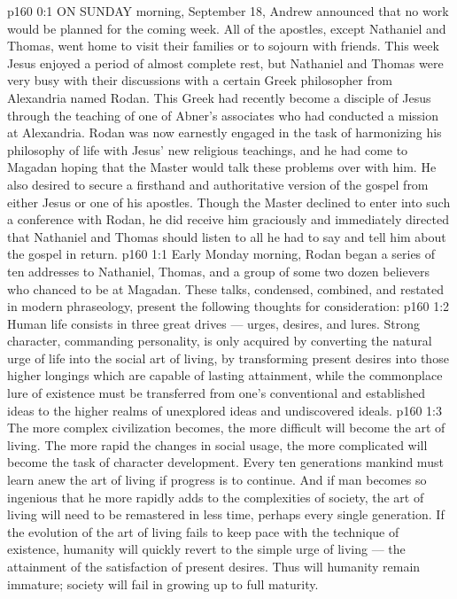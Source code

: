 \vs p160 0:1 ON SUNDAY morning, September 18, Andrew announced that no work would be planned for the coming week. All of the apostles, except Nathaniel and Thomas, went home to visit their families or to sojourn with friends. This week Jesus enjoyed a period of almost complete rest, but Nathaniel and Thomas were very busy with their discussions with a certain Greek philosopher from Alexandria named Rodan. This Greek had recently become a disciple of Jesus through the teaching of one of Abner’s associates who had conducted a mission at Alexandria. Rodan was now earnestly engaged in the task of harmonizing his philosophy of life with Jesus’ new religious teachings, and he had come to Magadan hoping that the Master would talk these problems over with him. He also desired to secure a firsthand and authoritative version of the gospel from either Jesus or one of his apostles. Though the Master declined to enter into such a conference with Rodan, he did receive him graciously and immediately directed that Nathaniel and Thomas should listen to all he had to say and tell him about the gospel in return.
\vs p160 1:1 Early Monday morning, Rodan began a series of ten addresses to Nathaniel, Thomas, and a group of some two dozen believers who chanced to be at Magadan. These talks, condensed, combined, and restated in modern phraseology, present the following thoughts for consideration:
\vs p160 1:2 \pc Human life consists in three great drives --- urges, desires, and lures. Strong character, commanding personality, is only acquired by converting the natural urge of life into the social art of living, by transforming present desires into those higher longings which are capable of lasting attainment, while the commonplace lure of existence must be transferred from one’s conventional and established ideas to the higher realms of unexplored ideas and undiscovered ideals.
\vs p160 1:3 The more complex civilization becomes, the more difficult will become the art of living. The more rapid the changes in social usage, the more complicated will become the task of character development. Every ten generations mankind must learn anew the art of living if progress is to continue. And if man becomes so ingenious that he more rapidly adds to the complexities of society, the art of living will need to be remastered in less time, perhaps every single generation. If the evolution of the art of living fails to keep pace with the technique of existence, humanity will quickly revert to the simple urge of living --- the attainment of the satisfaction of present desires. Thus will humanity remain immature; society will fail in growing up to full maturity.
